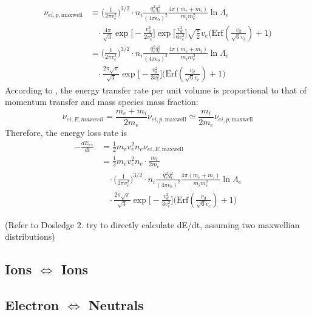 \documentclass{article}
\begin{document}
\begin{equation}
	\begin{split}
		\nu_{ei,p,\text{maxwell}} &\equiv \Big(\frac{1}{2\pi v_e^2} \Big)^{3/2} \cdot n_i\frac{q_e^2 q_i^2}{(4\pi \epsilon_0 )^2}\frac{4\pi(m_e+m_i)}{m_i m_e^2} \ln \Lambda_e \\
		 &\ \ \ \ \cdot \frac{4\pi}{\sqrt{3}} \exp\Big[-\frac{v_d^2}{2v_e^2} \Big] \exp\Big[\frac{v_d^2}{6v_e^2} \Big]\sqrt{\frac{\pi}{2}}v_e \Big(\text{Erf}(\frac{v_d}{\sqrt{6}v_e} ) + 1 \Big) \\
		 &= \Big(\frac{1}{2\pi v_e^2} \Big)^{3/2} \cdot n_i\frac{q_e^2 q_i^2}{(4\pi \epsilon_0 )^2}\frac{4\pi(m_e+m_i)}{m_i m_e^2} \ln \Lambda_e \\
		 &\ \ \ \ \cdot \frac{2\pi\sqrt{\pi}}{\sqrt{3}}\exp\Big[-\frac{v_d^2}{3v_e^2} \Big] \Big(\text{Erf}(\frac{v_d}{\sqrt{6}v_e} ) + 1 \Big)	
	\end{split}
\end{equation}
According to \cite{Chen:2016it}, the energy transfer rate per unit volume is proportional to that of momentum transfer and mass species mass fraction:
\begin{equation}
	\nu_{ei,E,maxwell} = \frac{m_e + m_i}{2m_e} \nu_{ei,p,\text{maxwell}} \simeq \frac{m_i}{2m_e} \nu_{ei,p,\text{maxwell}}
\end{equation}
Therefore, the energy loss rate is
\begin{equation}
	\begin{split}
		-\frac{d E_{ex}}{d t} &= \frac{1}{2} m_e v_e^2 n_e \nu_{ei,E,\text{maxwell}} \\
		&= \frac{1}{2} m_e v_e^2 n_e \cdot \frac{m_i}{2m_e} \\
		&\ \ \ \ \cdot \Big(\frac{1}{2\pi v_e^2} \Big)^{3/2} \cdot n_i\frac{q_e^2 q_i^2}{(4\pi \epsilon_0 )^2}\frac{4\pi(m_e+m_i)}{m_i m_e^2} \ln \Lambda_e \\
		&\ \ \ \ \cdot \frac{2\pi\sqrt{\pi}}{\sqrt{3}}\exp\Big[-\frac{v_d^2}{3v_e^2} \Big] \Big(\text{Erf}(\frac{v_d}{\sqrt{6}v_e} ) + 1 \Big)
	\end{split}
\end{equation}

(Refer to Dosledge 2. try to directly calculate dE/dt, assuming two maxwellian distributions)


\subsection{Ions $\Longleftrightarrow$ Ions}

\subsection{Electron $\Longleftrightarrow$ Neutrals}
\end{document}
